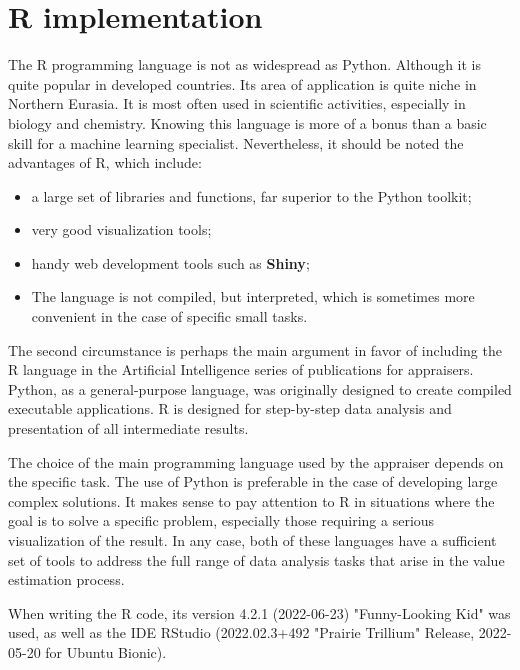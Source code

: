 \documentclass[]{scrreprt}
\begin{document}
\section{R implementation}\label{U-test-R}
%
%
The R programming language is not as widespread as Python. Although it is quite popular in developed countries. Its area of application is quite niche in Northern Eurasia. It is most often used in scientific activities, especially in biology and chemistry. Knowing this language is more of a bonus than a basic skill for a machine learning specialist. Nevertheless, it should be noted the advantages of R, which include:
\begin{itemize}
	\item a large set of libraries and functions, far superior to the Python toolkit;
	\item very good visualization tools;
	\item handy web development tools such as \textbf{Shiny};
	\item The language is not compiled, but interpreted, which is sometimes more convenient in the case of specific small tasks.
\end{itemize}
The second circumstance is perhaps the main argument in favor of including the R language in the Artificial Intelligence series of publications for appraisers. Python, as a general-purpose language, was originally designed to create compiled executable applications. R is designed for step-by-step data analysis and presentation of all intermediate results.

The choice of the main programming language used by the appraiser depends on the specific task. The use of Python is preferable in the case of developing large complex solutions. It makes sense to pay attention to R in situations where the goal is to solve a specific problem, especially those requiring a serious visualization of the result. In any case, both of these languages have a sufficient set of tools to address the full range of data analysis tasks that arise in the value estimation process.

When writing the R code, its version 4.2.1 (2022-06-23) "Funny-Looking Kid" was used, as well as the IDE RStudio (2022.02.3+492 "Prairie Trillium" Release, 2022-05-20 for Ubuntu Bionic).
\end{document}
